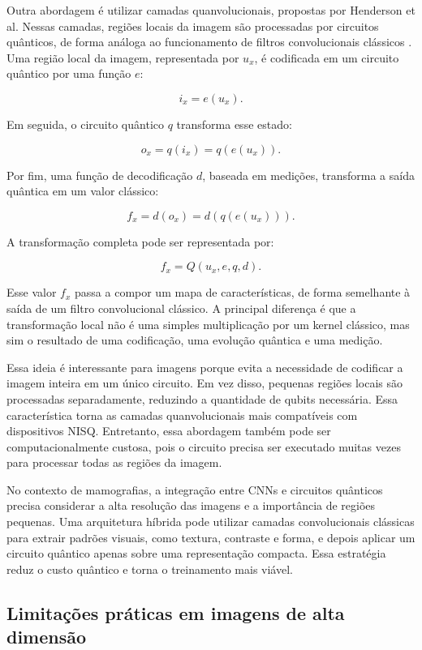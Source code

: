 \documentclass[
    12pt,
    openright,
    oneside,
    a4paper,
    english,
    brazil
]{abntex2}
\begin{document}
Outra abordagem é utilizar camadas quanvolucionais, propostas por Henderson et al. Nessas camadas, regiões locais da imagem são processadas por circuitos quânticos, de forma análoga ao funcionamento de filtros convolucionais clássicos \cite{henderson2020quanvolutional}. Uma região local da imagem, representada por \(u_x\), é codificada em um circuito quântico por uma função \(e\):

\[
i_x = e(u_x).
\]

Em seguida, o circuito quântico \(q\) transforma esse estado:

\[
o_x = q(i_x) = q(e(u_x)).
\]

Por fim, uma função de decodificação \(d\), baseada em medições, transforma a saída quântica em um valor clássico:

\[
f_x = d(o_x) = d(q(e(u_x))).
\]

A transformação completa pode ser representada por:

\[
f_x = Q(u_x, e, q, d).
\]

Esse valor \(f_x\) passa a compor um mapa de características, de forma semelhante à saída de um filtro convolucional clássico. A principal diferença é que a transformação local não é uma simples multiplicação por um kernel clássico, mas sim o resultado de uma codificação, uma evolução quântica e uma medição.

Essa ideia é interessante para imagens porque evita a necessidade de codificar a imagem inteira em um único circuito. Em vez disso, pequenas regiões locais são processadas separadamente, reduzindo a quantidade de qubits necessária. Essa característica torna as camadas quanvolucionais mais compatíveis com dispositivos NISQ. Entretanto, essa abordagem também pode ser computacionalmente custosa, pois o circuito precisa ser executado muitas vezes para processar todas as regiões da imagem.

No contexto de mamografias, a integração entre CNNs e circuitos quânticos precisa considerar a alta resolução das imagens e a importância de regiões pequenas. Uma arquitetura híbrida pode utilizar camadas convolucionais clássicas para extrair padrões visuais, como textura, contraste e forma, e depois aplicar um circuito quântico apenas sobre uma representação compacta. Essa estratégia reduz o custo quântico e torna o treinamento mais viável.

\subsection{Limitações práticas em imagens de alta dimensão}
\end{document}
